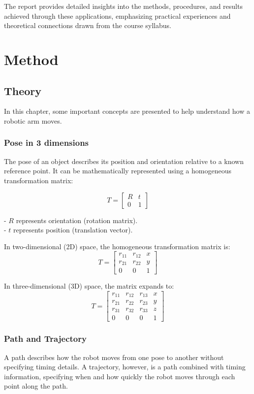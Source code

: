 \documentclass[a4paper,12pt]{article}
\begin{document}
The report provides detailed insights into the methods, procedures, and results achieved through these applications, emphasizing practical experiences and theoretical connections drawn from the course syllabus.

\section{Method}
\subsection{Theory}
In this chapter, some important concepts are presented to help understand how a robotic arm moves.

\subsubsection{Pose in 3 dimensions}
The pose of an object describes its position and orientation relative to a known reference point. It can be mathematically represented using a homogeneous transformation matrix:

\[
T = 
\begin{bmatrix}
R & t \\
0 & 1
\end{bmatrix}
\]

- \( R \) represents orientation (rotation matrix).
\\
- \( t \) represents position (translation vector).

In two-dimensional (2D) space, the homogeneous transformation matrix is:
\[
T =
\begin{bmatrix}
r_{11} & r_{12} & x \\
r_{21} & r_{22} & y \\
0 & 0 & 1
\end{bmatrix}
\]

In three-dimensional (3D) space, the matrix expands to:
\[
T = 
\begin{bmatrix}
r_{11} & r_{12} & r_{13} & x \\
r_{21} & r_{22} & r_{23} & y \\
r_{31} & r_{32} & r_{33} & z \\
0 & 0 & 0 & 1
\end{bmatrix}
\]

\subsubsection{Path and Trajectory}
A path describes how the robot moves from one pose to another without specifying timing details. A trajectory, however, is a path combined with timing information, specifying when and how quickly the robot moves through each point along the path.
\end{document}
